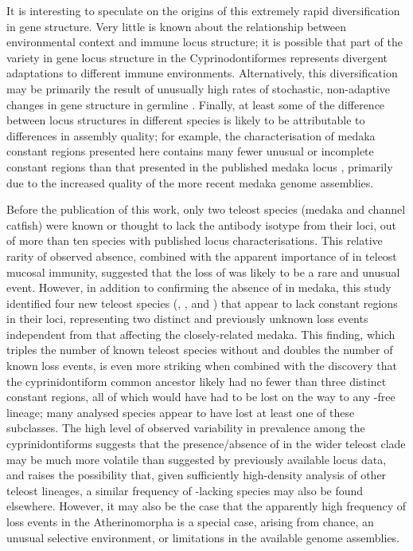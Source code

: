 It is interesting to speculate on the origins of this extremely rapid diversification in gene structure. Very little is known about the relationship between environmental context and immune locus structure; it is possible that part of the variety in \igh{} gene locus structure in the Cyprinodontiformes represents divergent adaptations to different immune environments. Alternatively, this diversification may be primarily the result of unusually high rates of stochastic, non-adaptive changes in gene structure in germline \igh{}. Finally, at least some of the difference between locus structures in different species is likely to be attributable to differences in assembly quality; for example, the characterisation of medaka constant regions presented here contains many fewer unusual or incomplete constant regions than that presented in the published medaka \igh{} locus \parencite{magadan2011medaka}, primarily due to the increased quality of the more recent medaka genome assemblies.

Before the publication of this work, only two teleost species (medaka and channel catfish) were known or thought to lack the  antibody isotype from their \igh{} loci, out of more than ten species with published locus characterisations. This relative rarity of observed absence, combined with the apparent importance of  in teleost mucosal immunity, suggested that the loss of  was likely to be a rare and unusual event. However, in addition to confirming the absence of  in medaka, this study identified four new teleost species (\nfu, ,  and ) that appear to lack  constant regions in their \igh{} loci, representing two distinct and previously unknown loss events independent from that affecting the closely-related medaka. This finding, which triples the number of known teleost species without  and doubles the number of known loss events, is even more striking when combined with the discovery that the cyprinidontiform common ancestor likely had no fewer than three distinct  constant regions, all of which would have had to be lost on the way to any -free lineage; many analysed species appear to have lost at least one of these  subclasses. The high level of observed variability in  prevalence among the cyprinidontiforms suggests that the presence/absence of  in the wider teleost clade may be much more volatile than suggested by previously available locus data, and raises the possibility that, given sufficiently high-density analysis of other teleost lineages, a similar frequency of -lacking species may also be found elsewhere. However, it may also be the case that the apparently high frequency of  loss events in the Atherinomorpha is a special case, arising from chance, an unusual selective environment, or limitations in the available genome assemblies.

